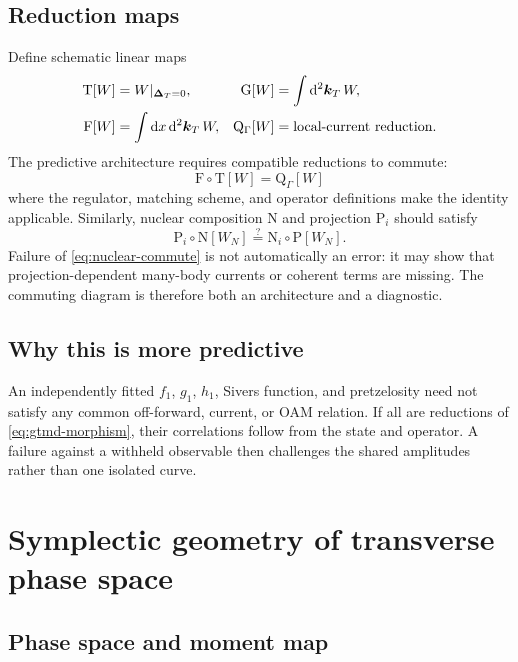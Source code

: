 \documentclass[11pt]{article}
\newcommand{\kT}{\bm{k}_{T}}
\newcommand{\DT}{\bm{\Delta}_{T}}
\newcommand{\dd}{\mathrm{d}}
\begin{document}
\subsection{Reduction maps}

Define schematic linear maps
\begin{align}
\mathrm T[W]&=W|_{\DT=0},&
\mathrm G[W]&=\int\dd^2\kT\,W,\nonumber\\
\mathrm F[W]&=\int\dd x\,\dd^2\kT\,W,&
\mathrm Q_\Gamma[W]&=\hbox{local-current reduction}.
\label{eq:reduction-maps}
\end{align}
The predictive architecture requires compatible reductions to commute:
\begin{equation}
\mathrm F\circ\mathrm T[W]
=
\mathrm Q_\Gamma[W]
\end{equation}
where the regulator, matching scheme, and operator definitions make the
identity applicable.  Similarly, nuclear composition \(\mathrm N\) and
projection \(\mathrm P_i\) should satisfy
\begin{equation}
\mathrm P_i\circ\mathrm N[W_N]
\stackrel{?}{=}
\mathrm N_i\circ\mathrm P[W_N].
\label{eq:nuclear-commute}
\end{equation}
Failure of \cref{eq:nuclear-commute} is not automatically an error: it may
show that projection-dependent many-body currents or coherent terms are
missing.  The commuting diagram is therefore both an architecture and a
diagnostic.

\subsection{Why this is more predictive}

An independently fitted \(f_1\), \(g_1\), \(h_1\), Sivers function, and
pretzelosity need not satisfy any common off-forward, current, or OAM
relation.  If all are reductions of \cref{eq:gtmd-morphism}, their
correlations follow from the state and operator.  A failure against a
withheld observable then challenges the shared amplitudes rather than one
isolated curve.

\section{Symplectic geometry of transverse phase space}

\subsection{Phase space and moment map}
\end{document}
